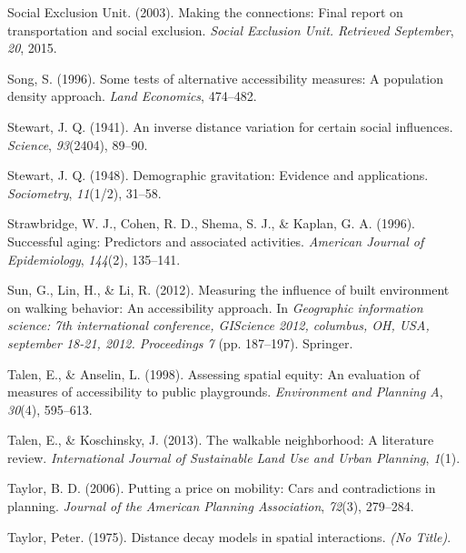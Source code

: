 \documentclass[
11pt, %
oneside, %
english, %
singlespacing, %
]{macthesis} %
\newlength{\cslhangindent}
\newenvironment{CSLReferences}[2] %
 {%
  \setlength{\parindent}{0pt}
  \ifodd #1 \everypar{\setlength{\hangindent}{\cslhangindent}}\ignorespaces\fi
  \ifnum #2 > 0
  \setlength{\parskip}{#2\baselineskip}
  \fi
 }%
 {}
\begin{document}
\begin{CSLReferences}{1}{0}
\leavevmode{}%
Social Exclusion Unit. (2003). Making the connections: Final report on transportation and social exclusion. \emph{Social Exclusion Unit. Retrieved September}, \emph{20}, 2015.

\leavevmode{}%
Song, S. (1996). Some tests of alternative accessibility measures: A population density approach. \emph{Land Economics}, 474--482.

\leavevmode{}%
Stewart, J. Q. (1941). An inverse distance variation for certain social influences. \emph{Science}, \emph{93}(2404), 89--90.

\leavevmode{}%
Stewart, J. Q. (1948). Demographic gravitation: Evidence and applications. \emph{Sociometry}, \emph{11}(1/2), 31--58.

\leavevmode{}%
Strawbridge, W. J., Cohen, R. D., Shema, S. J., \& Kaplan, G. A. (1996). Successful aging: Predictors and associated activities. \emph{American Journal of Epidemiology}, \emph{144}(2), 135--141.

\leavevmode{}%
Sun, G., Lin, H., \& Li, R. (2012). Measuring the influence of built environment on walking behavior: An accessibility approach. In \emph{Geographic information science: 7th international conference, GIScience 2012, columbus, OH, USA, september 18-21, 2012. Proceedings 7} (pp. 187--197). Springer.

\leavevmode{}%
Talen, E., \& Anselin, L. (1998). Assessing spatial equity: An evaluation of measures of accessibility to public playgrounds. \emph{Environment and Planning A}, \emph{30}(4), 595--613.

\leavevmode{}%
Talen, E., \& Koschinsky, J. (2013). The walkable neighborhood: A literature review. \emph{International Journal of Sustainable Land Use and Urban Planning}, \emph{1}(1).

\leavevmode{}%
Taylor, B. D. (2006). Putting a price on mobility: Cars and contradictions in planning. \emph{Journal of the American Planning Association}, \emph{72}(3), 279--284.

\leavevmode{}%
Taylor, Peter. (1975). Distance decay models in spatial interactions. \emph{(No Title)}.


\end{CSLReferences}
\end{document}
